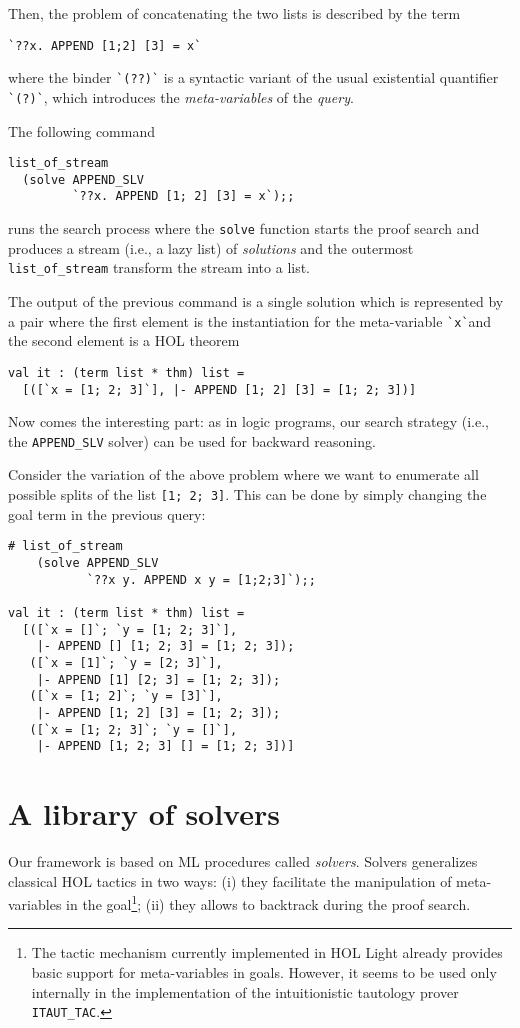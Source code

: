 Then, the problem of concatenating the two lists is described by the
term
\begin{verbatim}
`??x. APPEND [1;2] [3] = x`
\end{verbatim}
where the binder \verb|`(??)`| is a syntactic variant of the usual
existential quantifier \verb|`(?)`|, which introduces the
\emph{meta-variables} of the \emph{query}.

The following command
\begin{verbatim}
list_of_stream
  (solve APPEND_SLV
         `??x. APPEND [1; 2] [3] = x`);;
\end{verbatim}
runs the search process where the \verb|solve| function starts the
proof search and produces a stream (i.e., a lazy list) of
\emph{solutions} and the outermost \verb|list_of_stream| transform the
stream into a list.

The output of the previous command is a single solution which is
represented by a pair where the first element is the instantiation for
the meta-variable \verb|`x`|and the second element is a HOL theorem
\begin{verbatim}
val it : (term list * thm) list =
  [([`x = [1; 2; 3]`], |- APPEND [1; 2] [3] = [1; 2; 3])]
\end{verbatim}

Now comes the interesting part: as in logic programs, our search
strategy (i.e., the \verb|APPEND_SLV| solver) can be used for backward
reasoning.

Consider the variation of the above problem where we want to enumerate
all possible splits of the list \verb|[1; 2; 3]|.  This can be done by
simply changing the goal term in the previous query:
\begin{verbatim}
# list_of_stream
    (solve APPEND_SLV
           `??x y. APPEND x y = [1;2;3]`);;

val it : (term list * thm) list =
  [([`x = []`; `y = [1; 2; 3]`],
    |- APPEND [] [1; 2; 3] = [1; 2; 3]);
   ([`x = [1]`; `y = [2; 3]`],
    |- APPEND [1] [2; 3] = [1; 2; 3]);
   ([`x = [1; 2]`; `y = [3]`],
    |- APPEND [1; 2] [3] = [1; 2; 3]);
   ([`x = [1; 2; 3]`; `y = []`],
    |- APPEND [1; 2; 3] [] = [1; 2; 3])]
\end{verbatim}

\section{A library of solvers}
\label{sec:library-solvers}

Our framework is based on ML procedures called \emph{solvers}.
Solvers generalizes classical HOL tactics in two ways: (i) they
facilitate the manipulation of meta-variables in the goal\footnote{The
  tactic mechanism currently implemented in HOL Light already provides
  basic support for meta-variables in goals.  However, it seems to be
  used only internally in the implementation of the intuitionistic
  tautology prover \texttt{ITAUT\_TAC}.}; (ii) they allows to backtrack
during the proof search.

